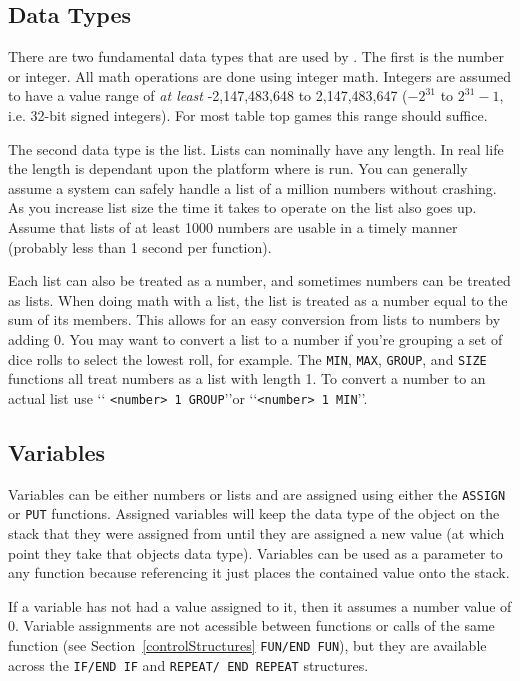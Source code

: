 \subsection{Data Types}
\label{datatypes}
There are two fundamental data types that are used by \progLogo. The first is
the number or integer. All math operations are done using integer math.
Integers are assumed to have a value range of \emph{at least}
-2,147,483,648 to 2,147,483,647 ($-2^{31}$ to $2^{31}-1$, i.e. 32-bit signed
integers). For most table top games this range should suffice.

The second data type is the list. Lists can nominally have any length. In real
life the length is dependant upon the platform where \progLogo is run. You can
generally assume a system can safely handle a list of a million numbers
without crashing. As you increase list size the time it takes to operate on the
list also goes up. Assume that lists of at least 1000 numbers are usable in a
timely manner (probably less than 1 second per function).

Each list can also be treated as a number, and sometimes numbers can be treated
as lists. When doing math with a list, the list is treated as a number equal to
the sum of its members. This allows for an easy conversion from lists to numbers
by adding 0. You may want to convert a list to a number if you're grouping a set
of dice rolls to select the lowest roll, for example. The \texttt{MIN},
\texttt{MAX}, \texttt{GROUP}, and \texttt{SIZE} functions all treat numbers as
a list with length 1. To convert a number to an actual list use \lq\lq%
\texttt{<number> 1 GROUP}\rq\rq or \lq\lq\texttt{<number> 1 MIN}\rq\rq.


\subsection{Variables}
\label{variables}
Variables can be either numbers or lists and are assigned using either the
\texttt{ASSIGN} or \texttt{PUT} functions. Assigned variables will keep the
data type of the object on the stack that they were assigned from until they
are assigned a new value (at which point they take that objects data type).
Variables can be used as a parameter to any function because referencing it
just places the contained value onto the stack.

If a variable has not had a value assigned to it, then it assumes a number
value of 0. Variable assignments are not acessible between functions or calls
of the same function (see Section~\ref{controlStructures} \texttt{FUN/END FUN}),
but they are available across the \texttt{IF/END IF} and \texttt{REPEAT/%
END REPEAT} structures.

